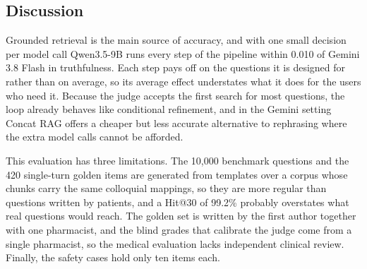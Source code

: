\subsection{Discussion}\label{sec:discussion}

Grounded retrieval is the main source of accuracy, and with one small decision per model call Qwen3.5-9B runs every step of the pipeline within 0.010 of Gemini 3.8 Flash in truthfulness. Each step pays off on the questions it is designed for rather than on average, so its average effect understates what it does for the users who need it. Because the judge accepts the first search for most questions, the loop already behaves like conditional refinement, and in the Gemini setting Concat RAG offers a cheaper but less accurate alternative to rephrasing where the extra model calls cannot be afforded.

This evaluation has three limitations. The 10{,}000 benchmark questions and the 420 single-turn golden items are generated from templates over a corpus whose chunks carry the same colloquial mappings, so they are more regular than questions written by patients, and a Hit@30 of 99.2\% probably overstates what real questions would reach. The golden set is written by the first author together with one pharmacist, and the blind grades that calibrate the judge come from a single pharmacist, so the medical evaluation lacks independent clinical review. Finally, the safety cases hold only ten items each.
